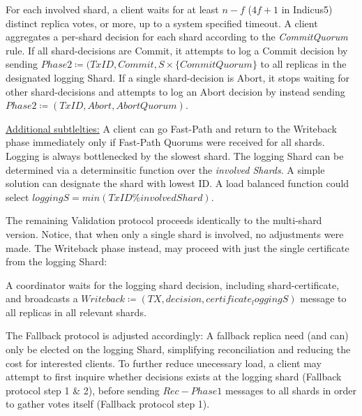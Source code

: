 For each involved shard, a client waits for at least $n-f$ ($4f+1$ in Indicus5) distinct replica votes, or more, up to a system specified timeout. A client aggregates a per-shard decision for each shard according to the \textit{CommitQuorum} rule. If all shard-decisions are Commit, it attempts to log a Commit decision by sending $Phase2 \coloneqq (TxID, Commit, S \times \{CommitQuorum\}$ to all replicas in the designated logging Shard. If a single shard-decision is Abort, it stops waiting for other shard-decisions and attempts to log an Abort decision by instead sending $Phase2 \coloneqq (TxID, Abort, AbortQuorum)$. 

\underline{Additional subtlelties:} A client can go Fast-Path and return to the Writeback phase immediately only if Fast-Path Quorums were received for all shards. Logging is always bottlenecked by the slowest shard. The logging Shard can be determined via a determinsitic function over the \textit{involved Shards}. A simple solution can designate the shard with lowest ID. A load balanced function could select $loggingS = min(TxID \% involvedShard)$.

The remaining Validation protocol proceeds identically to the multi-shard version. Notice, that when only a single shard is involved, no adjustments were made. The Writeback phase instead, may proceed with just the single certificate from the logging Shard: 

A coordinator waits for the logging shard decision, including shard-certificate, and broadcasts a $Writeback \coloneqq (TX, decision, certificate_loggingS )$ message to all replicas in all relevant shards.

The Fallback protocol is adjusted accordingly: A fallback replica need (and can) only be elected on the logging Shard, simplifying reconciliation and reducing the cost for interested clients. 
To further reduce unecessary load, a client may attempt to first inquire whether decisions exists at the logging shard (Fallback protocol step 1 \& 2), before sending $Rec-Phase1$ messages to all shards in order to gather votes itself (Fallback protocol step 1). 


